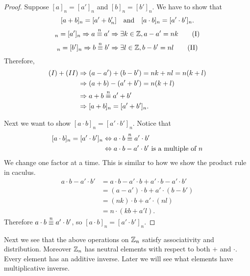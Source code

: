 \begin{proof}
    Suppose $[a]_n=[a']_n$ and $[b]_n=[b']_n$. We have to show that
    \[[a+b]_n=[a'+b'_n]\text{\quad and\quad}[a\cdot b]_n=[a'\cdot b']_n.\]
    \begin{equation}
        [a]_n=[a']_n\Rightarrow a\modnequiv a'\Rightarrow\exists k\in\FZ,a-a'=nk\tag{I}
    \end{equation}
    \begin{equation}
        [b]_n=[b']_n\Rightarrow b\modnequiv b'\Rightarrow\exists l\in\FZ,b-b'=nl\tag{II}
    \end{equation}
    Therefore,
    \[\begin{split}
        (I)+(II)
        &\Rightarrow (a-a')+(b-b')=nk+nl=n(k+l)\\
        &\Rightarrow (a+b)-(a'+b')=n(k+l)\\
        &\Rightarrow a+b\overset{n}{\equiv} a'+b'\\
        &\Rightarrow [a+b]_n=[a'+b']_n.
    \end{split}\]

    Next we want to show $[a\cdot b]_n=[a'\cdot b']_n$. Notice
    that 
    \[\begin{split}
        [a\cdot b]_n=[a'\cdot b']_n
        &\Leftrightarrow a\cdot b\overset{n}{\equiv} a'\cdot b'\\
        &\Leftrightarrow a\cdot b-a'\cdot b'\text{ is a multiple of }n
    \end{split}\]
    We change one factor at a time. This is similar to how we show
    the product rule in caculus.
    \[\begin{split}
        a\cdot b-a'\cdot b'
        &=a\cdot b-a'\cdot b+a'\cdot b-a'\cdot b'\\
        &=(a-a')\cdot b+a'\cdot (b-b')\\
        &=(nk)\cdot b+a'\cdot(nl)\\
        &=n\cdot (kb+a'l).
    \end{split}\]
    Therefore $a\cdot b\overset{n}{\equiv} a'\cdot b'$, so $[a\cdot b]_n=[a'\cdot b']_n$.
\end{proof}

Next we see that the above operations on $\mathbb{Z}_n$
satisfy associativity and distribution. Moreover
$\mathbb{Z}_n$ has neutral elements with respect to both $+$ and $\cdot$.
Every element has an additive inverse. Later we will see
what elements have multiplicative inverse.

